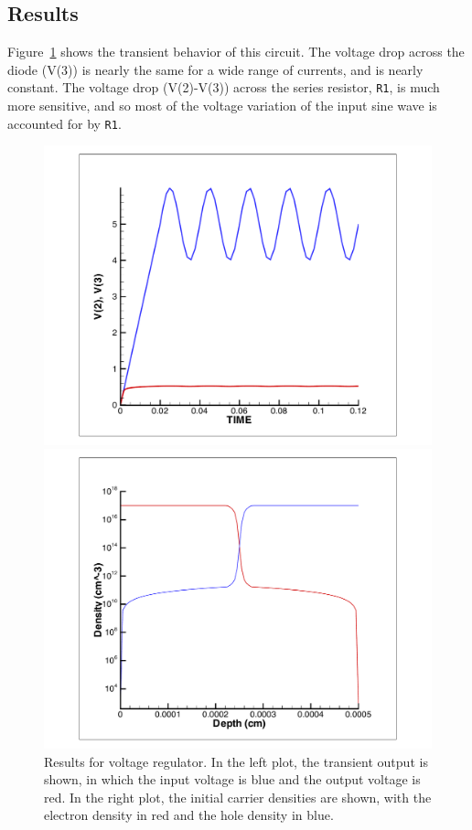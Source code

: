 \subsection{Results}
Figure~\ref{One_D_outputSignal} shows the transient behavior of this circuit.  
The voltage drop across the diode (V(3)) is nearly the same for a wide 
range of currents, and is nearly constant.  The
voltage drop (V(2)-V(3)) across the series resistor, \texttt{R1}, is much more
sensitive, and so most of the voltage 
variation of the input sine wave is accounted for by \texttt{R1}.
\begin{figure}
\begin{minipage}[b]{0.5\linewidth}
\centering
\includegraphics[scale=0.4]{Z1_trans}
\end{minipage}
\hspace{0.5cm}
\begin{minipage}[b]{0.5\linewidth}
\centering
\includegraphics[scale=0.4]{Z1_dens}
\end{minipage}
\caption[Results for voltage regulator]{Results for voltage regulator.  In the left plot, the transient output is shown, in which the input voltage is blue and the output voltage is red.  In the right plot, the initial carrier densities are shown, with the electron density in red and the hole density in blue.}
\label{One_D_outputSignal}
\end{figure}

